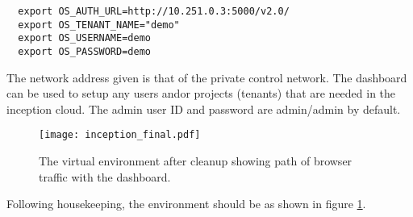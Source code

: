 \small\begin{verbatim}
  export OS_AUTH_URL=http://10.251.0.3:5000/v2.0/
  export OS_TENANT_NAME="demo"
  export OS_USERNAME=demo
  export OS_PASSWORD=demo
\end{verbatim}\normalsize

The network address given is that of the private control network. 
The dashboard can be used to setup any users and\/or projects (tenants) that are needed in the inception cloud. 
The admin user ID and password are admin/admin by default. 

\begin{figure}
  \centering
  \texttt{[image: inception\_final.pdf]}
  \caption{
	\small The virtual environment after cleanup showing path of browser traffic with the dashboard.
  	\label{fg_final}\normalsize
  }
  \normalsize
\end{figure}
Following housekeeping, the environment should be as shown in figure \ref{fg_final}.
